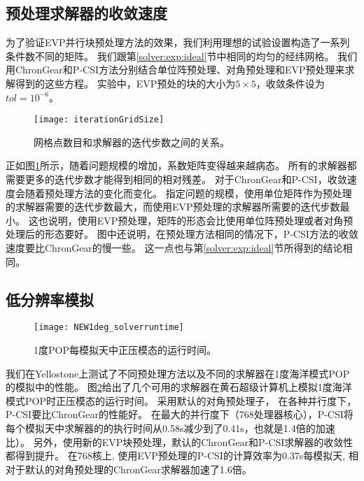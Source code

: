 \subsection{预处理求解器的收敛速度}\label{precond:exp:ideal}

为了验证EVP并行块预处理方法的效果，我们利用理想的试验设置构造了一系列条件数不同的矩阵。
我们跟第\ref{solver:exp:ideal}节中相同的均匀的经纬网格。
我们用ChronGear和P-CSI方法分别结合单位阵预处理、对角预处理和EVP预处理来求解得到的这些方程。
实验中，EVP预处的块的大小为$5\times5$，收敛条件设为$tol = 10^{-6}$。 
 

\begin{figure} 
\vspace{5pt}
\centering
\texttt{[image: iterationGridSize]}
\caption[] {网格点数目和求解器的迭代步数之间的关系。\label{fig:iterationGridSizePrecond}}
\end{figure}

正如图\ref{fig:iterationGridSizePrecond}所示，随着问题规模的增加，系数矩阵变得越来越病态。
所有的求解器都需要更多的迭代步数才能得到相同的相对残差。
对于ChronGear和P-CSI，收敛速度会随着预处理方法的变化而变化。 
指定问题的规模，使用单位矩阵作为预处理的求解器需要的迭代步数最大，而使用EVP预处理的求解器所需要的迭代步数最小。 
这也说明，使用EVP预处理，矩阵的形态会比使用单位阵预处理或者对角预处理后的形态要好。 
图中还说明，在预处理方法相同的情况下，P-CSI方法的收敛速度要比ChronGear的慢一些。 
这一点也与第\ref{solver:exp:ideal}节所得到的结论相同。 


\subsection{低分辨率模拟}
\label{precond:exp:low}
\begin {figure}[ht]
\centering
\texttt{[image: NEW1deg\_solverruntime]}
\caption []{1度POP每模拟天中正压模态的运行时间。\label {fig:runtime1}}
\end {figure}
我们在Yellostone上测试了不同预处理方法以及不同的求解器在1度海洋模式POP的模拟中的性能。
图\ref{fig:runtime1}给出了几个可用的求解器在黄石超级计算机上模拟1度海洋模式POP时正压模态的运行时间。  
采用默认的对角预处理子， 在各种并行度下， P-CSI要比ChronGear的性能好。
在最大的并行度下（768处理器核心），P-CSI将每个模拟天中求解器的的执行时间从0.58s减少到了0.41s，也就是1.4倍的加速比）。 
另外，使用新的EVP块预处理，默认的ChronGear和P-CSI求解器的收敛性都得到提升。 
在768核上, 使用EVP预处理的P-CSI的计算效率为0.37s每模拟天, 相对于默认的对角预处理的ChronGear求解器加速了1.6倍。 



